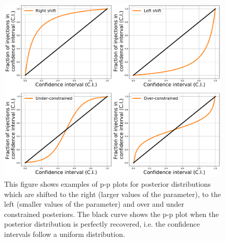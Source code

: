 \begin{figure}[ht]
    \centering
    \includegraphics[width=0.9\linewidth]{C5_parameter/ppplot_examples.pdf}
    \caption[p-p plot examples]{This figure shows examples of p-p plots for
posterior distributions which are shifted to the right (larger values of the
parameter), to the left (smaller values of the parameter) and over and under
constrained posteriors. The black curve shows the p-p plot when the posterior
distribution is perfectly recovered, i.e. the confidence intervals follow a
uniform distribution.}
\label{par_est:results:ppplot_example}
\end{figure}

